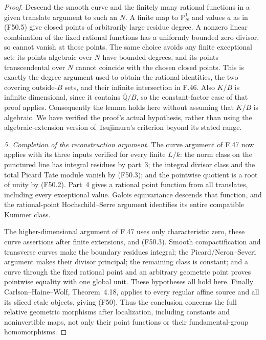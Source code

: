 \begin{proof}
Descend the smooth curve and the finitely many rational functions
in a given translate argument to such an $N$. A finite map to
$\mathbb P^1_N$ and values $a$ as in (F50.5) give closed points
of arbitrarily large residue degree. A nonzero linear combination
of the fixed rational functions has a uniformly bounded zero
divisor, so cannot vanish at those points. The same choice avoids
any finite exceptional set: its points algebraic over $N$ have
bounded degrees, and its points transcendental over $N$ cannot
coincide with the chosen closed points. This is exactly the
degree argument used to obtain the rational identities, the two
covering outside-$B$ sets, and their infinite intersection in
F.46. Also $K/B$ is infinite dimensional, since it contains
$\overline{\mathbb Q}/B$, so the constant-factor case of that
proof applies. Consequently the lemma holds here without assuming
that $K/B$ is algebraic. We have verified the proof's actual
hypothesis, rather than using the algebraic-extension version of
Tsujimura's criterion beyond its stated range.

\emph{5. Completion of the reconstruction argument.}
The curve argument of F.47 now applies with its three inputs
verified for every finite $L/k$: the norm class on the punctured
line has integral residues by part~3; the integral divisor class
and the total Picard Tate module vanish by (F50.3); and the
pointwise quotient is a root of unity by (F50.2). Part~4 gives a
rational point function from all translates, including every
exceptional value. Galois equivariance descends that function,
and the rational-point Hochschild--Serre argument identifies its
entire compatible Kummer class.

The higher-dimensional argument of F.47 uses only characteristic
zero, these curve assertions after finite extensions, and
(F50.3). Smooth compactification and transverse curves make the
boundary residues integral; the Picard/Neron--Severi argument
makes their divisor principal; the remaining class is constant;
and a curve through the fixed rational point and an arbitrary
geometric point proves pointwise equality with one global unit.
These hypotheses all hold here. Finally Carlson--Haine--Wolf,
Theorem~4.18, applies to every regular affine source and all its
sliced etale objects, giving (F50). Thus the conclusion concerns
the full relative geometric morphisms after localization, including
constants and noninvertible maps, not only their point functions
or their fundamental-group homomorphisms.
\end{proof}
